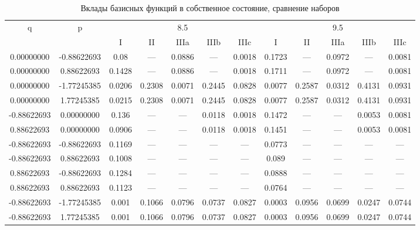 \documentclass[a4paper,14pt]{extarticle}
\begin{document}
\begin{landscape}
\begin{table}[H]
\centering
\caption{Вклады базисных функций в собственное состояние, сравнение наборов}
\begin{tabular}{|c|c|*{5}{c}|*{5}{c}|}
\hline
\multirow{2}{*}{q} & \multirow{2}{*}{p} & \multicolumn{5}{|c|}{8.5}                  & \multicolumn{5}{|c|}{9.5}                  \\
\cline{3-12}
                   &                    & I      & II     & IIIa   & IIIb   & IIIc   & I      & II     & IIIa   & IIIb   & IIIc   \\ 
\hline
 0.00000000        & -0.88622693        & 0.08   & ---    & 0.0886 & ---    & 0.0018 & 0.1723 & ---    & 0.0972 & ---    & 0.0081 \\
 0.00000000        &  0.88622693        & 0.1428 & ---    & 0.0886 & ---    & 0.0018 & 0.1711 & ---    & 0.0972 & ---    & 0.0081 \\
 0.00000000        & -1.77245385        & 0.0206 & 0.2308 & 0.0071 & 0.2445 & 0.0828 & 0.0077 & 0.2587 & 0.0312 & 0.4131 & 0.0931 \\
 0.00000000        &  1.77245385        & 0.0215 & 0.2308 & 0.0071 & 0.2445 & 0.0828 & 0.0077 & 0.2587 & 0.0312 & 0.4131 & 0.0931 \\
-0.88622693        &  0.00000000        & 0.136  & ---    & ---    & 0.0118 & 0.0018 & 0.1472 & ---    & ---    & 0.0053 & 0.0081 \\
 0.88622693        &  0.00000000        & 0.0906 & ---    & ---    & 0.0118 & 0.0018 & 0.1451 & ---    & ---    & 0.0053 & 0.0081 \\
-0.88622693        & -0.88622693        & 0.1169 & ---    & ---    & ---    & ---    & 0.0773 & ---    & ---    & ---    & ---    \\
-0.88622693        &  0.88622693        & 0.1008 & ---    & ---    & ---    & ---    & 0.089  & ---    & ---    & ---    & ---    \\
 0.88622693        & -0.88622693        & 0.1284 & ---    & ---    & ---    & ---    & 0.0888 & ---    & ---    & ---    & ---    \\
 0.88622693        &  0.88622693        & 0.1123 & ---    & ---    & ---    & ---    & 0.0764 & ---    & ---    & ---    & ---    \\
-0.88622693        & -1.77245385        & 0.001  & 0.1066 & 0.0796 & 0.0737 & 0.0827 & 0.0003 & 0.0956 & 0.0699 & 0.0247 & 0.0744 \\
-0.88622693        &  1.77245385        & 0.001  & 0.1066 & 0.0796 & 0.0737 & 0.0827 & 0.0003 & 0.0956 & 0.0699 & 0.0247 & 0.0744 \\

\end{tabular}
\end{table}
\end{landscape}
\end{document}
